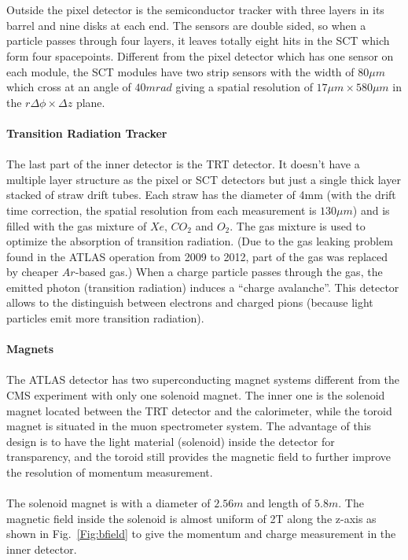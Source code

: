 \\
\\Outside the pixel detector is the semiconductor tracker with three layers in its barrel and nine disks at each end. The sensors are double sided, so when a particle passes through four layers, it leaves totally eight hits in the SCT which form four spacepoints. Different from the pixel detector which has one sensor on each module, the SCT modules have two strip sensors with the width of $80\mu m$ which cross at  an angle of $40mrad$ giving a spatial resolution of $17\mu m \times 580 \mu m$ in the $r\Delta \phi \times \Delta z$ plane. 
\\
\\{\bf Transition Radiation Tracker}
\\
\\The last part of the inner detector is the TRT detector. It doesn't have a multiple layer structure as the pixel or SCT detectors but just a single thick layer stacked of straw drift tubes. Each straw has the diameter of 4mm (with the drift time correction, the spatial resolution from each measurement is $130\mu m$) and is filled with the gas mixture of $Xe$, $CO_{2}$ and $O_{2}$. The gas mixture is used to optimize the absorption of transition radiation. (Due to the gas leaking problem found in the ATLAS operation from 2009 to 2012, part of the gas was replaced by cheaper $Ar$-based gas.) When a charge particle passes through the gas, the emitted photon (transition radiation) induces a ``charge avalanche''. This detector allows to the distinguish between electrons and charged pions (because light particles emit more transition radiation).
\\
\\{\bf Magnets}
\\
\\ The ATLAS detector has two superconducting magnet systems different from the CMS experiment with only one solenoid magnet. The inner one is the solenoid magnet located between the TRT detector and the calorimeter, while the toroid magnet is situated in the muon spectrometer system. The advantage of this design is to have the light material (solenoid) inside the detector for transparency, and the toroid still provides the magnetic field to further improve the resolution of momentum measurement.  
\\
\\The solenoid magnet is with a diameter of $2.56m$ and length of $5.8m$.  The magnetic field inside the solenoid is almost uniform of 2T along the z-axis as shown in Fig.~\ref{Fig:bfield} to give the momentum and charge measurement in the inner detector. 
